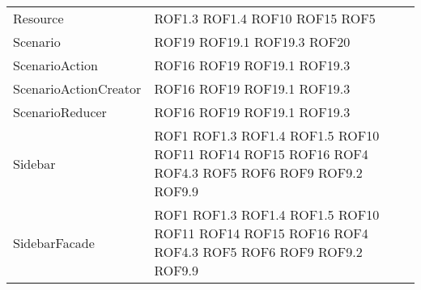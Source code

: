 \begin{longtable}{p{5cm}!{\VRule[1pt]}p{2.5cm}}
		Resource & ROF1.3 \newline ROF1.4 \newline ROF10 \newline ROF15 \newline ROF5\\
		Scenario & ROF19 \newline ROF19.1 \newline ROF19.3 \newline ROF20\\
		ScenarioAction & ROF16 \newline ROF19 \newline ROF19.1 \newline ROF19.3\\
		ScenarioActionCreator & ROF16 \newline ROF19 \newline ROF19.1 \newline ROF19.3\\
		ScenarioReducer & ROF16 \newline ROF19 \newline ROF19.1 \newline ROF19.3\\
		Sidebar & ROF1 \newline ROF1.3 \newline ROF1.4 \newline ROF1.5 \newline ROF10 \newline ROF11 \newline ROF14 \newline ROF15 \newline ROF16 \newline ROF4 \newline ROF4.3 \newline ROF5 \newline ROF6 \newline ROF9 \newline ROF9.2 \newline ROF9.9\\
		SidebarFacade & ROF1 \newline ROF1.3 \newline ROF1.4 \newline ROF1.5 \newline ROF10 \newline ROF11 \newline ROF14 \newline ROF15 \newline ROF16 \newline ROF4 \newline ROF4.3 \newline ROF5 \newline ROF6 \newline ROF9 \newline ROF9.2 \newline ROF9.9\\

\end{longtable}
